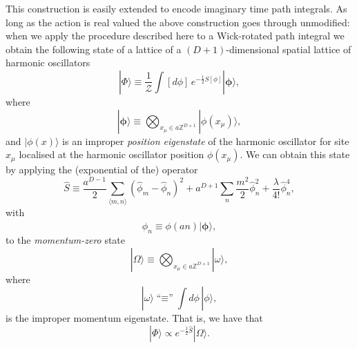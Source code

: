 \documentclass[twocolumn,lengthcheck,superscriptaddress]{revtex4-1}
\theoremstyle{definition}
\theoremstyle{remark}
\begin{document}
This construction is easily extended to encode imaginary time path integrals. As long as the action is real valued the above construction goes through unmodified: when we apply the procedure described here to a Wick-rotated path integral we obtain the following state of a lattice of a $(D+1)$-dimensional spatial lattice of harmonic oscillators 
\begin{equation}
	|\Phi\rangle \equiv \frac{1}{\mathcal{Z}}\int [d\phi] \,e^{-\frac{1}{2}S[\phi]}  |\boldsymbol{\phi}\rangle,
\end{equation}
where
\begin{equation}
	|\boldsymbol{\phi}\rangle \equiv \bigotimes_{x_\mu\in a\mathbb{Z}^{D+1}} |\phi(x_\mu)\rangle,
\end{equation}
and $|\phi(x)\rangle$ is an improper \emph{position eigenstate} of the harmonic oscillator for site $x_\mu$ localised at the harmonic oscillator position $\phi(x_\mu)$. We can obtain this state by applying the (exponential of the) operator 
\begin{equation}
	\widehat{S} \equiv \frac{a^{D-1}}{2}\sum_{\langle m,n\rangle} (\widehat{\phi}_m-\widehat{\phi}_n)^2 + a^{D+1}\sum_{n} \frac{m^2}{2}\widehat{\phi}_n^2 + \frac{\lambda}{4!} \widehat{\phi}_n^4,
\end{equation}
with 
\begin{equation}
	\widehat{\phi}_n  \equiv \phi(an)|\boldsymbol{\phi}\rangle,
\end{equation}
to the \emph{momentum-zero} state
\begin{equation}
	|\Omega\rangle \equiv \bigotimes_{x_\mu\in a\mathbb{Z}^{D+1}} |\omega\rangle,
\end{equation}
where
\begin{equation}
	|\omega\rangle \text{``$\equiv$''} \int d\phi\, |\phi\rangle,
\end{equation}
is the improper momentum eigenstate. That is, we have that
\begin{equation}
	|\Phi\rangle \propto e^{-\frac12 \widehat{S}}|\Omega\rangle. 
\end{equation}
\end{document}
